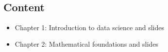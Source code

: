 \documentclass[letterpaper,10pt,english]{jupyterBook}
\begin{document}
\subsection{Content}
\label{\detokenize{course-schedule:content}}\begin{itemize}
\item {} 
\sphinxAtStartPar
Chapter 1: Introduction to data science \sphinxhyphen{} {\hyperref[\detokenize{chapter-1-intro-to-data-science::doc}]{}} and slides

\item {} 
\sphinxAtStartPar
Chapter 2: Mathematical foundations \sphinxhyphen{} {\hyperref[\detokenize{chapter-2-mathematical-foundations::doc}]{}} and slides

\end{itemize}
\end{document}
